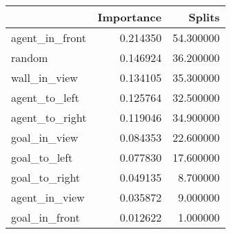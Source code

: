 \begin{tabular}{lrr}
\toprule
 & Importance & Splits \\
\midrule
agent\_in\_front & 0.214350 & 54.300000 \\
random & 0.146924 & 36.200000 \\
wall\_in\_view & 0.134105 & 35.300000 \\
agent\_to\_left & 0.125764 & 32.500000 \\
agent\_to\_right & 0.119046 & 34.900000 \\
goal\_in\_view & 0.084353 & 22.600000 \\
goal\_to\_left & 0.077830 & 17.600000 \\
goal\_to\_right & 0.049135 & 8.700000 \\
agent\_in\_view & 0.035872 & 9.000000 \\
goal\_in\_front & 0.012622 & 1.000000 \\
\bottomrule
\end{tabular}